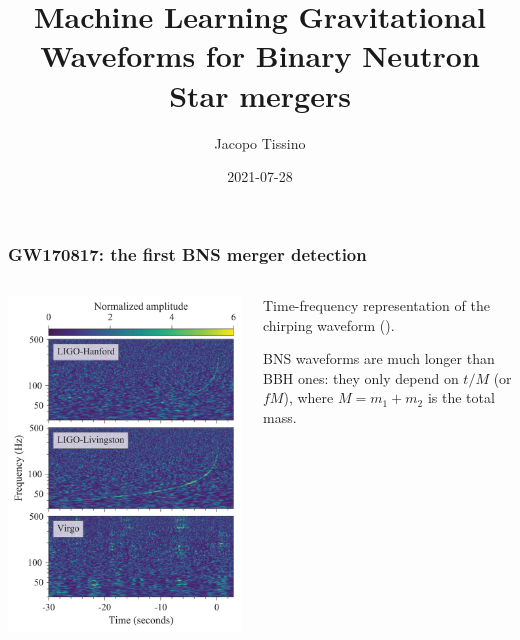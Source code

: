 \documentclass{beamer}
\title{Machine Learning Gravitational Waveforms for Binary Neutron Star mergers}
\author{Jacopo Tissino}
\date{2021-07-28}
\begin{document}
\frame{\titlepage}

\begin{frame}
    \frametitle{GW170817: the first BNS merger detection}
    \begin{columns}
        
    \begin{column}{0.5\textwidth}
    \includegraphics[width=\textwidth]{figures/836px-GW170817_spectrograms.svg.png}
    \end{column}

    \begin{column}{0.5\textwidth}
    Time-frequency representation of the chirping waveform
    (\cite[]{abbottGW170817ObservationGravitational2017}).

    BNS waveforms are much longer than BBH ones: they only depend on \(t/M \) (or \(fM\)), where \(M = m_1 + m_2 \) is the total mass.
    \end{column}
    \end{columns}
\end{frame}
\end{document}
